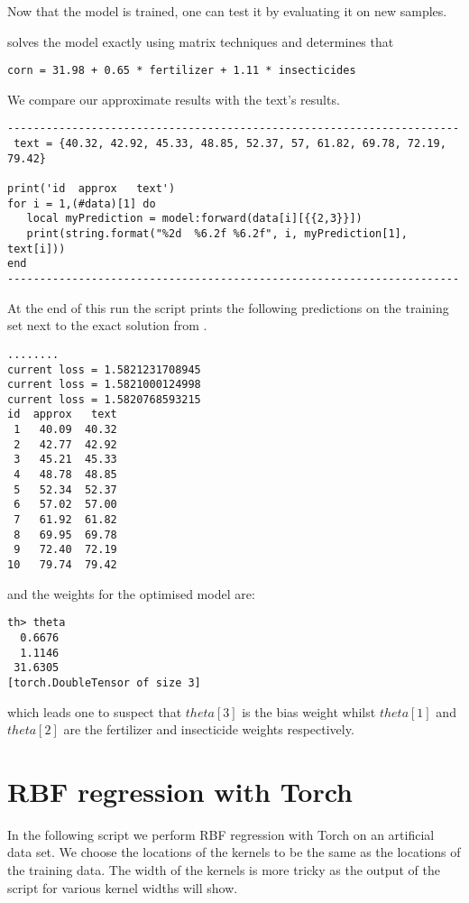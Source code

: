 Now that the model is trained, one can test it by evaluating it on new samples.

\cite{schaum} solves the model exactly using matrix techniques and determines that 

{\tt corn = 31.98 + 0.65 * fertilizer + 1.11 * insecticides}

We compare our approximate results with the text's results.

\begin{verbatim}
----------------------------------------------------------------------
 text = {40.32, 42.92, 45.33, 48.85, 52.37, 57, 61.82, 69.78, 72.19, 79.42}

print('id  approx   text')
for i = 1,(#data)[1] do
   local myPrediction = model:forward(data[i][{{2,3}}])
   print(string.format("%2d  %6.2f %6.2f", i, myPrediction[1], text[i]))
end
----------------------------------------------------------------------
\end{verbatim}

At the end of this run the script prints the following predictions on the training set
next to the exact solution from \cite{schaum}.

\begin{verbatim}
........
current loss = 1.5821231708945	
current loss = 1.5821000124998	
current loss = 1.5820768593215	
id  approx   text	
 1   40.09  40.32	
 2   42.77  42.92	
 3   45.21  45.33	
 4   48.78  48.85	
 5   52.34  52.37	
 6   57.02  57.00	
 7   61.92  61.82	
 8   69.95  69.78	
 9   72.40  72.19	
10   79.74  79.42	
 \end{verbatim}

and the weights for the optimised model are:

\begin{verbatim}
th> theta
  0.6676
  1.1146
 31.6305
[torch.DoubleTensor of size 3]
\end{verbatim}

which leads one to suspect that $theta[3]$ is the bias weight whilst $theta[1]$ and $theta[2]$ are the
fertilizer and insecticide weights respectively.
\clearpage



\section{RBF regression with Torch}
\label{app:rbf_regression}

In the following script we perform RBF regression with Torch on an artificial data set.
We choose the locations of the kernels to be the same as the locations of the training data.
The width of the kernels is more tricky as the output of the script for various kernel widths will show.

